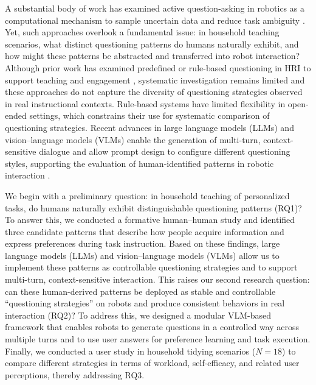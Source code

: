 \documentclass[sigconf,authordraft]{acmart}
\begin{document}
A substantial body of work has examined active question-asking in robotics as a computational mechanism to sample uncertain data and reduce task ambiguity \cite{cakmak2012designing,biyik2019asking,habibian2022here}. Yet, such approaches overlook a fundamental issue: in household teaching scenarios, what distinct questioning patterns do humans naturally exhibit, and how might these patterns be abstracted and transferred into robot interaction? Although prior work has examined predefined or rule-based questioning in HRI to support teaching and engagement \cite{12biyik2019asking}, systematic investigation remains limited \cite{robinson2023probing,hu2024designing} and these approaches do not capture the diversity of questioning strategies observed in real instructional contexts. Rule-based systems have limited flexibility in open-ended settings, which constrains their use for systematic comparison of questioning strategies. Recent advances in large language models (LLMs) and vision--language models (VLMs) enable the generation of multi-turn, context-sensitive dialogue and allow prompt design to configure different questioning styles, supporting the evaluation of human-identified patterns in robotic interaction \cite{driess2023palm,huang2023instruct2act,8leusmann2025investigating}.


We begin with a preliminary question: in household teaching of personalized tasks, do humans naturally exhibit distinguishable questioning patterns (RQ1)? To answer this, we conducted a formative human--human study and identified three candidate patterns that describe how people acquire information and express preferences during task instruction. Based on these findings, large language models (LLMs) and vision--language models (VLMs) allow us to implement these patterns as controllable questioning strategies and to support multi-turn, context-sensitive interaction. This raises our second research question: can these human-derived patterns be deployed as stable and controllable ``questioning strategies'' on robots and produce consistent behaviors in real interaction (RQ2)? To address this, we designed a modular VLM-based framework that enables robots to generate questions in a controlled way across multiple turns and to use user answers for preference learning and task execution. Finally, we conducted a user study in household tidying scenarios ($N=18$) to compare different strategies in terms of workload, self-efficacy, and related user perceptions, thereby addressing RQ3.
\end{document}
